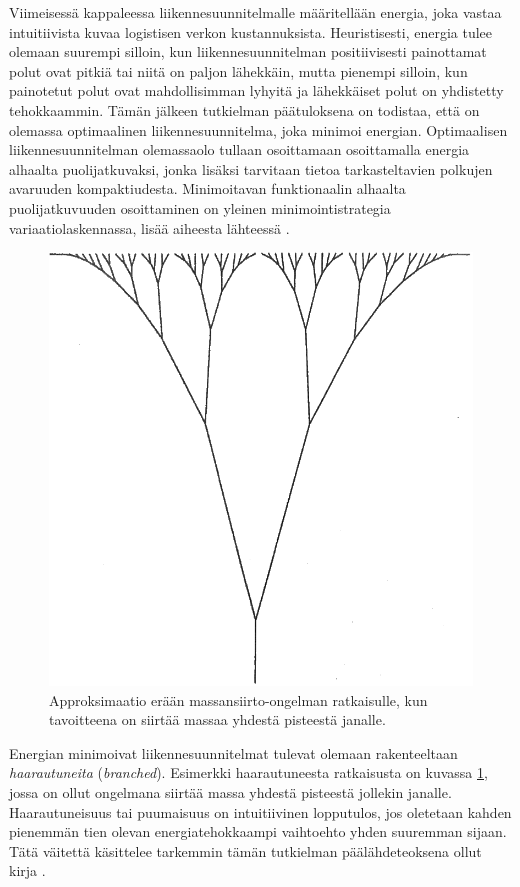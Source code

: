 \documentclass[12pt,oneside,a4paper]{amsbook} %
\begin{document}
Viimeisessä kappaleessa liikennesuunnitelmalle määritellään energia, joka vastaa intuitiivista kuvaa logistisen verkon kustannuksista. Heuristisesti, energia tulee olemaan suurempi silloin, kun liikennesuunnitelman positiivisesti painottamat polut ovat pitkiä tai niitä on paljon lähekkäin, mutta pienempi silloin, kun painotetut polut ovat mahdollisimman lyhyitä ja lähekkäiset polut on yhdistetty tehokkaammin. Tämän jälkeen tutkielman päätuloksena on todistaa, että on olemassa optimaalinen liikennesuunnitelma, joka minimoi energian. Optimaalisen liikennesuunnitelman olemassaolo tullaan osoittamaan osoittamalla energia alhaalta puolijatkuvaksi, jonka lisäksi tarvitaan tietoa tarkasteltavien polkujen avaruuden kompaktiudesta. Minimoitavan funktionaalin alhaalta puolijatkuvuuden osoittaminen on yleinen minimointistrategia variaatiolaskennassa, lisää aiheesta lähteessä \cite{benesova}.

\begin{figure}
    \centering
    \includegraphics[scale=0.7]{graphics/johdanto_branched.png}
    \caption{Approksimaatio erään massansiirto-ongelman ratkaisulle, kun tavoitteena on siirtää massaa yhdestä pisteestä janalle. \cite[s. 166]{optimal}}
    \label{fig:branched}
\end{figure}

Energian minimoivat liikennesuunnitelmat tulevat olemaan rakenteeltaan \textit{haarautuneita} (\textit{branched}). Esimerkki haarautuneesta ratkaisusta on kuvassa \ref{fig:branched}, jossa on ollut ongelmana siirtää massa yhdestä pisteestä jollekin janalle. Haarautuneisuus tai puumaisuus on intuitiivinen lopputulos, jos oletetaan kahden pienemmän tien olevan energiatehokkaampi vaihtoehto yhden suuremman sijaan. Tätä väitettä käsittelee tarkemmin tämän tutkielman päälähdeteoksena ollut kirja \cite{optimal}.
\end{document}
